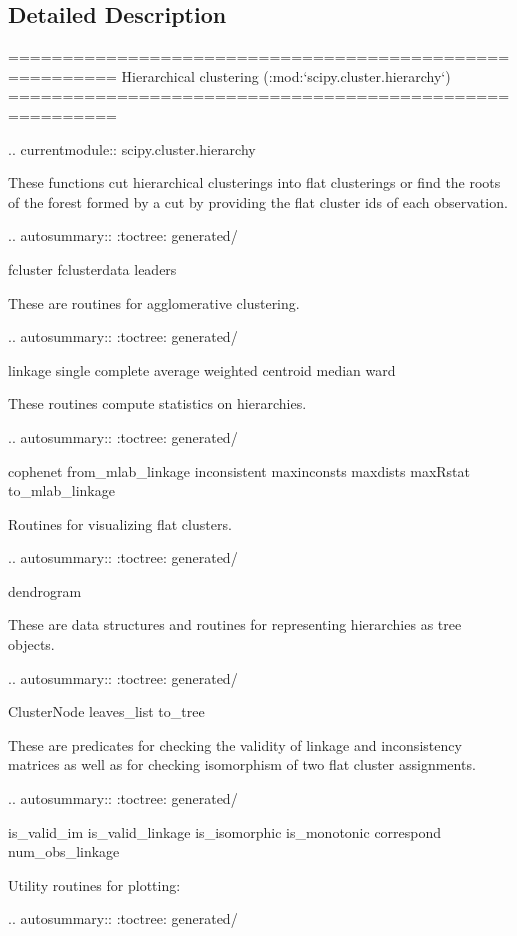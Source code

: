 \subsection{Detailed Description}
\begin{DoxyVerb}========================================================
Hierarchical clustering (:mod:`scipy.cluster.hierarchy`)
========================================================

.. currentmodule:: scipy.cluster.hierarchy

These functions cut hierarchical clusterings into flat clusterings
or find the roots of the forest formed by a cut by providing the flat
cluster ids of each observation.

.. autosummary::
   :toctree: generated/

   fcluster
   fclusterdata
   leaders

These are routines for agglomerative clustering.

.. autosummary::
   :toctree: generated/

   linkage
   single
   complete
   average
   weighted
   centroid
   median
   ward

These routines compute statistics on hierarchies.

.. autosummary::
   :toctree: generated/

   cophenet
   from_mlab_linkage
   inconsistent
   maxinconsts
   maxdists
   maxRstat
   to_mlab_linkage

Routines for visualizing flat clusters.

.. autosummary::
   :toctree: generated/

   dendrogram

These are data structures and routines for representing hierarchies as
tree objects.

.. autosummary::
   :toctree: generated/

   ClusterNode
   leaves_list
   to_tree

These are predicates for checking the validity of linkage and
inconsistency matrices as well as for checking isomorphism of two
flat cluster assignments.

.. autosummary::
   :toctree: generated/

   is_valid_im
   is_valid_linkage
   is_isomorphic
   is_monotonic
   correspond
   num_obs_linkage

Utility routines for plotting:

.. autosummary::
   :toctree: generated/


\end{DoxyVerb}
